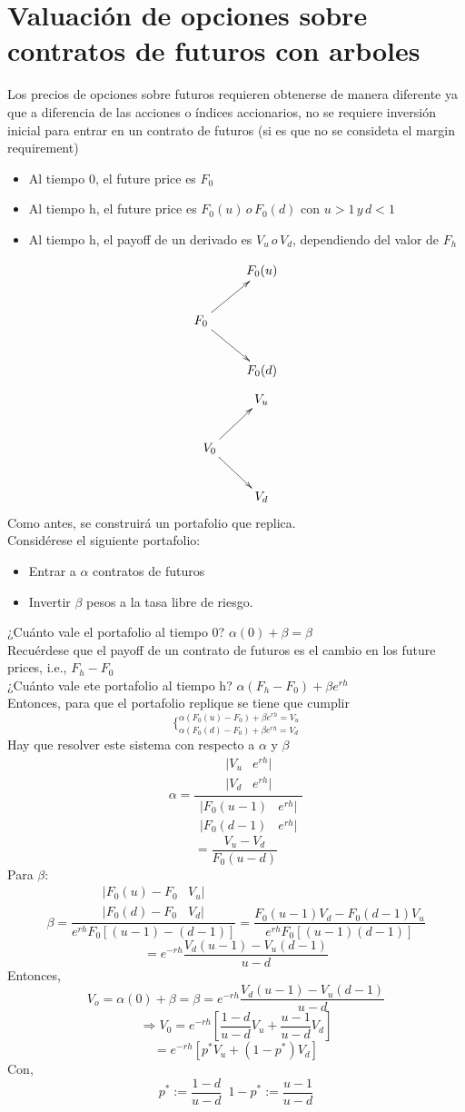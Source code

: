 \documentclass[12pts]{extarticle}
\begin{document}
\section{Valuación de opciones sobre contratos de futuros con arboles}
Los precios de opciones sobre futuros requieren obtenerse de manera diferente ya que a diferencia de las acciones o índices accionarios, no se requiere inversión inicial para entrar en un contrato de futuros (si es que no se consideta el margin requirement)  
\begin{itemize} 
\item Al tiempo 0, el future price es $F_0$ 
\item Al tiempo h, el future price es $F_0(u) \, o \, F_0(d)$ con $u>1 \, y \, d<1$ 
\item Al tiempo h, el payoff de un derivado es $V_u \, o \, V_d$, dependiendo del valor de $F_h$
\end{itemize} 

$$\xymatrix{&F_0(u) \\ F_0 \ar[ru] \ar[dr] & \\ &F_0(d)}$$ 
 $$\xymatrix{&V_u \\ V_0 \ar[ru] \ar[dr] & \\ &V_d } $$
Como antes, se construirá un portafolio que replica. \\
Considérese el siguiente portafolio: 
\begin{itemize} 
\item Entrar a $\alpha$ contratos de futuros
\item Invertir $\beta$ pesos a la tasa libre de riesgo. 
\end{itemize} 
¿Cuánto vale el portafolio al tiempo 0? $\alpha (0)+\beta=\beta$ 
\\ 
Recuérdese que el payoff de un contrato de futuros es el cambio en los future prices, i.e., $F_h -F_0$ \\
¿Cuánto vale ete portafolio al tiempo h? $\alpha (F_h-F_0)+\beta e^{rh}$ 
\\
Entonces, para que el portafolio replique se tiene que cumplir 
$$\Bigg \{_{\alpha(F_0(d)-F_0)+\beta e^{rh}=V_d}^{\alpha(F_0(u)-F_0)+\beta e^{rh}=V_u}$$
Hay que resolver este sistema con respecto a $\alpha$ y $\beta$ 
$$\alpha=\frac{\begin{matrix} |V_u & e^{rh}|\\ |V_d & e^{rh}| \end{matrix}}{\begin{matrix}| F_0(u-1) & e^{rh}|\\| F_0(d-1) & e^{rh}|  \end{matrix}}$$
$$=\frac{V_u-V_d}{F_0(u-d)}$$
Para $\beta$: 
$$\beta=\frac{\begin{matrix} |F_0(u)-F_0 & V_u|\\ |F_0(d)-F_0 & V_d| \end{matrix}}{e^{rh}F_0[(u-1)-(d-1)]}=\frac{F_0(u-1)V_d-F_0(d-1)V_u}{e^{rh}F_0[(u-1)(d-1)]}$$
$$=e^{-rh}\frac{V_d(u-1)-V_u(d-1)}{u-d}$$
Entonces, 
$$V_o=\alpha (0)+\beta =\beta=e^{-rh}\frac{V_d(u-1)-V_u(d-1)}{u-d}$$
$$\Rightarrow V_0=e^{-rh}[\frac{1-d}{u-d}V_u + \frac{u-1}{u-d}V_d]$$
$$=e^{-rh}[p^{*}V_u +(1-p^{*})V_d]$$
Con, $$ p^{*}:= \frac{1-d}{u-d} \, \, \, 1-p^{*}:= \frac{u-1}{u-d} $$
\end{document}
